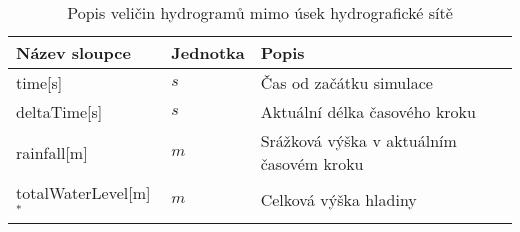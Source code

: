 
\begin{table}[t]
 

 \centering
 \caption{Popis veličin hydrogramů mimo úsek hydrografické sítě}
\label{tab:vystupydat}

 \begin{tabular}{llp{}}
  \hline  \hline
 Název sloupce    & Jednotka    & Popis       \\ 
  \hline
 time[s]          &   $s$      &  Čas od začátku simulace          \\
 deltaTime[s]     &   $s$        &  Aktuální délka časového kroku  \\
 rainfall[m]      &  $m$         &  Srážková výška v aktuálním časovém kroku \\
 totalWaterLevel[m]$^*$	  &   $m$	&  Celková výška hladiny  \\ 

\end{tabular}
\end{table}

